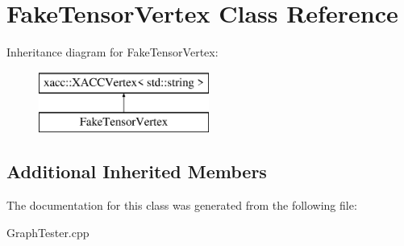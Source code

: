 \hypertarget{a01212}{}\section{Fake\+Tensor\+Vertex Class Reference}
\label{a01212}
Inheritance diagram for Fake\+Tensor\+Vertex\+:\begin{figure}[H]
\begin{center}
\leavevmode
\includegraphics[height=2.000000cm]{a01212}
\end{center}
\end{figure}
\subsection*{Additional Inherited Members}


The documentation for this class was generated from the following file\+:\begin{DoxyCompactItemize}
\item 
Graph\+Tester.\+cpp\end{DoxyCompactItemize}

